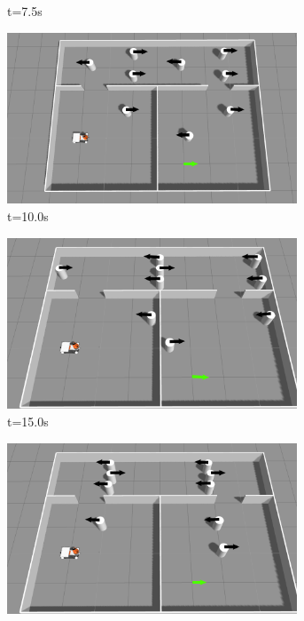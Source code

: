 \documentclass{beamer}
\begin{document}
\begin{frame}
\begin{figure}[H]
\begin{subfigure}[b]{0.35\linewidth}
            \caption{t=7.5s}
        \end{subfigure}
        \begin{subfigure}[b]{0.35\linewidth}
            \centering
            \includegraphics[width=0.95\textwidth]{../report/images/test_case_3/mid2.png}
            \caption{t=10.0s}
        \end{subfigure}%
        \begin{subfigure}[b]{0.35\linewidth}
            \centering
            \includegraphics[width=0.95\textwidth]{../report/images/test_case_3/exp3.png}
            \caption{t=15.0s}
        \end{subfigure}%
        \begin{subfigure}[b]{0.35\linewidth}
            \centering
            \includegraphics[width=0.95\textwidth]{../report/images/test_case_3/exp4.png}

\end{subfigure}
\end{figure}
\end{frame}
\end{document}

